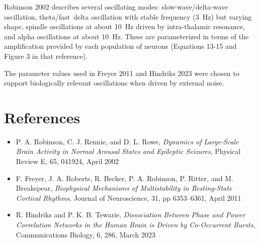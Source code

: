 Robinson 2002 describes several oscillating modes: slow-wave/delta-wave
oscillation, theta/fast~delta oscillation with stable frequency (3~Hz) but
varying shape, spindle oscillations at about 10~Hz driven by intra-thalamic
resonance, and alpha oscillations at about 10~Hz. These are parameterized
in terms of the amplification provided by each population of neurons
(Equations 13-15 and Figure 3 in that reference).

The parameter values used in Freyer 2011 and Hindriks 2023 were chosen to
support biologically relevant oscillations when driven by external noise.

%
%
\section{References}
\label{sect-robinson-refs}

\begin{itemize}
%
\item P. A. Robinson, C. J. Rennie, and D. L. Rowe, \textit{Dynamics of
Large-Scale Brain Activity in Normal Arousal States and Epileptic Seizures},
Physical Review E, 65, 041924, April 2002
%
\item F. Freyer, J. A. Roberts, R. Becker, P. A. Robinson, P. Ritter, and
M. Breakspear, \textit{Biophysical Mechanisms of Multistability in
Resting-State Cortical Rhythms}, Journal of Neuroscience, 31,
pp 6353--6361, April 2011
%
\item R. Hindriks and P. K. B. Tewarie, \textit{Dissociation Between Phase
and Power Correlation Networks in the Human Brain is Driven by Co-Occurrent
Bursts}, Communications Biology, 6, 286, March 2023
%
\end{itemize}

%
%
